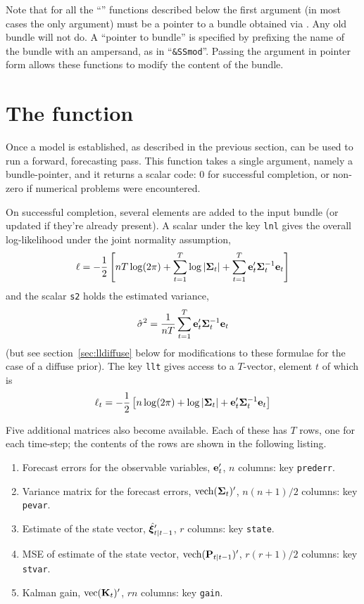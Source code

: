 \documentclass[a4paper]{article}
\begin{document}
Note that for all the ``'' functions described below the
first argument (in most cases the only argument) must be a pointer to
a bundle obtained via . Any old bundle will not do. A
``pointer to bundle'' is specified by prefixing the name of the bundle
with an ampersand, as in ``\verb|&SSmod|''. Passing the argument in
pointer form allows these functions to modify the content of the
bundle. 

\section{The  function}
\label{sec:kfilter}

Once a model is established, as described in the previous section,
 can be used to run a forward, forecasting pass.  This
function takes a single argument, namely a bundle-pointer, and it
returns a scalar code: 0 for successful completion, or non-zero if
numerical problems were encountered.

On successful completion, several elements are added to the input
bundle (or updated if they're already present).  A scalar under the
key \texttt{lnl} gives the overall log-likelihood under the joint
normality assumption,
%
\[
  \ell = -\frac{1}{2} \left[nT \log(2 \pi) + \sum_{t=1}^T\log \left|\bm{\Sigma}_t\right| + 
    \sum_{t=1}^T\mathbf{e}_t'\bm{\Sigma}_t^{-1} \mathbf{e}_t
  \right]
\]
%
and the scalar \texttt{s2} holds the estimated variance,
%
\[
\hat{\sigma}^2 = \frac{1}{nT} 
   \sum_{t=1}^T\mathbf{e}_t'\bm{\Sigma}_t^{-1} \mathbf{e}_t
\]
(but see section~\ref{sec:lldiffuse} below for modifications to these
formulae for the case of a diffuse prior).  The key \texttt{llt} gives
access to a $T$-vector, element $t$ of which is
%
\[
  \ell_t = -\frac{1}{2} \left[n \log(2 \pi) + \log \left|\bm{\Sigma}_t\right| + 
    \mathbf{e}_t'\bm{\Sigma}_t^{-1} \mathbf{e}_t
  \right]
\]
%

Five additional matrices also become available.  Each of these has $T$
rows, one for each time-step; the contents of the rows are shown in
the following listing.
%
\begin{enumerate}
\item Forecast errors for the observable variables, $\mathbf{e}_t'$, $n$
  columns: key \texttt{prederr}.
\item Variance matrix for the forecast errors, $\mbox{vech}(\bm{\Sigma}_t)'$,
  $n(n+1)/2$ columns: key \texttt{pevar}.
\item Estimate of the state vector, $\hat{\bm{\xi}}_{t|t-1}'$, $r$
  columns: key \texttt{state}.
\item MSE of estimate of the state vector,
  $\mbox{vech}(\mathbf{P}_{t|t-1})'$, $r(r+1)/2$ columns: key \texttt{stvar}.
\item Kalman gain, $\mbox{vec}(\mathbf{K}_t)'$, $rn$ columns: key
  \texttt{gain}.
\end{enumerate}
\end{document}
